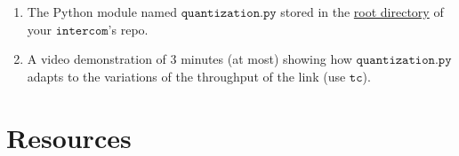 \begin{enumerate}
  \item The Python module named $\mathtt{quantization.py}$ stored in
    the \href{https://github.com/Tecnologias-multimedia/intercom}{root
      directory} of your $\mathtt{intercom}$'s repo.
  \item A video demonstration of 3 minutes (at most) showing how
    $\mathtt{quantization.py}$ adapts to the variations of the
    throughput of the link (use $\mathtt{tc}$).
\end{enumerate}

\section{Resources}


